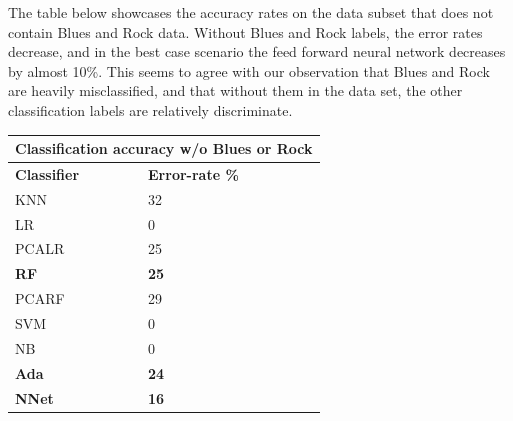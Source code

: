 \documentclass{article} %
\begin{document}
The table below showcases the accuracy rates on the data subset that does not contain Blues and Rock data. Without Blues and Rock labels, the error rates decrease, and in the best case scenario the feed forward neural network decreases by almost 10\%. This seems to agree with our observation that Blues and Rock are heavily misclassified, and that without them in the data set, the other classification labels are relatively discriminate.
\begin{center}
	\begin{tabular}{ |p{2cm}|p{2.3cm}|}
		\hline
		\multicolumn{2}{|c|}{\textbf{Classification accuracy w/o Blues or Rock}} \\
		\hline
		\textbf{Classifier} & \textbf{Error-rate \%} \\
		\hline
		KNN & 32 \\
		LR & 0  \\
		PCALR & 25 \\
		\textbf{RF}    &  \textbf{25} \\
		PCARF & 29 \\
		SVM & 0 \\
		NB & 0 \\
		\textbf{Ada} & \textbf{24} \\
		\textbf{NNet} & \textbf{16} \\
		\hline
	\end{tabular}
\end{center}
\end{document}
